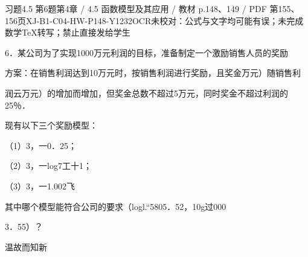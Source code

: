 \begin{bankitem}{习题4.5 第6题}{第4章 / 4.5 函数模型及其应用 / 教材 p.148、149 / PDF 第155、156页}{XJ-B1-C04-HW-P148-Y1232}{OCR未校对：公式与文字均可能有误；未完成数学TeX转写；禁止直接发给学生}
\begin{ocrdraft}
\par
6．某公司为了实现1000万元利润的目标，准备制定一个激励销售人员的奖励
\par
方案：在销售利润达到10万元时，按销售利润进行奖励，且奖金万元）随销售利
\par
润云万元）的增加而增加，但奖金总数不超过5万元，同时奖金不超过利润的25％．
\par
现有以下三个奖励模型：
\par
（1）3，一0．25；
\par
（2）3，一log7工十1；
\par
（3）3，一1.002飞
\par
其中哪个模型能符合公司的要求（logl.“5805．52，10g过000
\par
3．55）？
\par
[教材p.149 / PDF第156页]
\par
温故而知新
\end{ocrdraft}
\end{bankitem}
